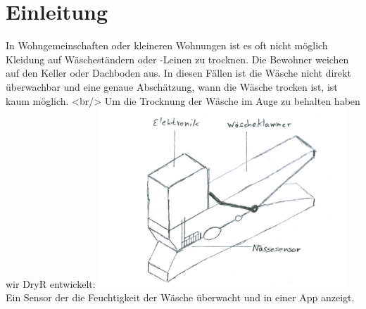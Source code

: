 \section{Einleitung}
\item[Einleitung]
\begin{description}
	In Wohngemeinschaften oder kleineren Wohnungen ist es oft nicht möglich Kleidung auf Wäscheständern oder -Leinen zu trocknen. Die Bewohner weichen auf den Keller oder Dachboden aus. In diesen Fällen ist die Wäsche nicht direkt überwachbar und eine genaue Abschätzung, wann die Wäsche trocken ist, ist kaum möglich. <br/>
Um die Trocknung der Wäsche im Auge zu behalten haben wir DryR entwickelt:
\includegraphics[width=0.7\textwidth]{01-klammer.png}
Ein Sensor der die Feuchtigkeit der Wäsche überwacht und in einer App anzeigt.
\end{description}
